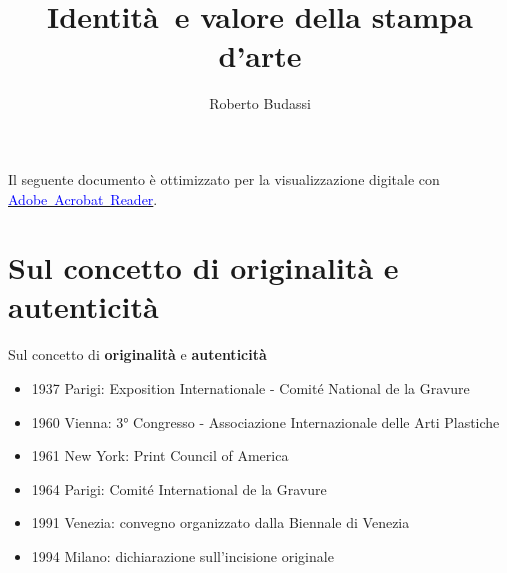 \documentclass[hidelinks,aspectratio=169]{beamer}
\title[Identità e valore della stampa d'arte]{\textbf{Identità e valore della stampa d'arte}}
\author{Roberto Budassi}
\date{}
\begin{document}
	
		\begin{frame}
		\maketitle
		
		\vspace*{\fill}
		\centering
		\fboxrule=2pt
		\fbox
		{
			\begin{minipage}{0.9\linewidth}
				\small{Il seguente documento è ottimizzato per la visualizzazione digitale con \href{https://get.adobe.com/it/reader/}{\textcolor{blue}{Adobe~Acrobat~Reader}}.}  
			\end{minipage}
		}
	\end{frame}
	
	\begin{frame}
		\tableofcontents
	\end{frame}
	
	\section{Sul concetto di \textbf{originalità} e \textbf{autenticità}}
	\begin{frame}{Sul concetto di \textbf{originalità} e \textbf{autenticità}}
		\begin{itemize}
			\item 1937	Parigi: Exposition Internationale - Comité National de la Gravure
			\item 1960	Vienna: 3° Congresso - Associazione Internazionale delle Arti Plastiche
			\item 1961	New York: Print Council of America
			\item 1964	Parigi: Comité International de la Gravure
			\item 1991	Venezia: convegno organizzato dalla Biennale di Venezia
			\item 1994	Milano: dichiarazione sull’incisione originale
		\end{itemize}
	\end{frame}
	
\end{document}
